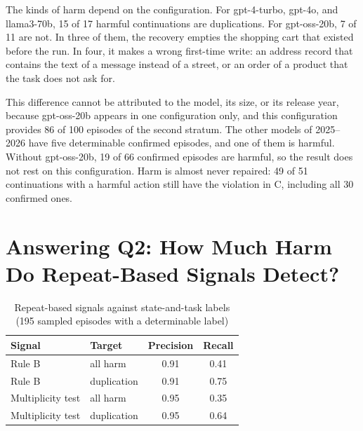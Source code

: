 \documentclass[conference]{IEEEtran}
\begin{document}
The kinds of harm depend on the configuration. For gpt-4-turbo, gpt-4o, and llama3-70b, 15 of 17 harmful continuations are duplications. For gpt-oss-20b, 7 of 11 are not. In three of them, the recovery empties the shopping cart that existed before the run. In four, it makes a wrong first-time write: an address record that contains the text of a message instead of a street, or an order of a product that the task does not ask for.

This difference cannot be attributed to the model, its size, or its release year, because gpt-oss-20b appears in one configuration only, and this configuration provides 86 of 100 episodes of the second stratum. The other models of 2025--2026 have five determinable confirmed episodes, and one of them is harmful. Without gpt-oss-20b, 19 of 66 confirmed episodes are harmful, so the result does not rest on this configuration. Harm is almost never repaired: 49 of 51 continuations with a harmful action still have the violation in C, including all 30 confirmed ones.

\section{Answering Q2: How Much Harm Do Repeat-Based Signals Detect?}\label{sec:signals}

\begin{table}[t]
\caption{Repeat-based signals against state-and-task labels (195 sampled episodes with a determinable label)}
\label{tab:signals}
\centering
\begin{tabular}{@{}llcc@{}}
\toprule
Signal & Target & Precision & Recall\\
\midrule
Rule B & all harm & 0.91 & 0.41\\
Rule B & duplication & 0.91 & 0.75\\
Multiplicity test & all harm & 0.95 & 0.35\\
Multiplicity test & duplication & 0.95 & 0.64\\
\bottomrule
\end{tabular}
\end{table}
\end{document}
